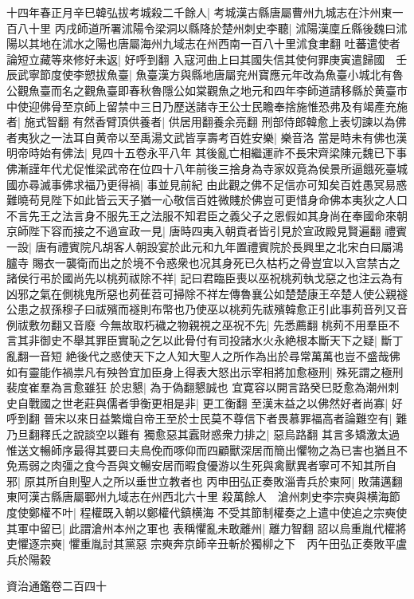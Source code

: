 十四年春正月辛巳韓弘拔考城殺二千餘人|{
	考城漢古縣唐屬曹州九城志在汴州東一百八十里}
丙戌師道所署沭陽令梁洞以縣降於楚州刺史李聽|{
	沭陽漢廩丘縣後魏曰沭陽以其地在沭水之陽也唐屬海州九域志在州西南一百八十里沭食聿翻}
吐蕃遣使者論短立藏等來修好未返|{
	好呼到翻}
入寇河曲上曰其國失信其使何罪庚寅遣歸國　壬辰武寧節度使李愬拔魚臺|{
	魚臺漢方與縣地唐屬兖州寶應元年改為魚臺小城北有魯公觀魚臺而名之觀魚臺即春秋魯隱公如棠觀魚之地元和四年李師道請移縣於黄臺市}
中使迎佛骨至京師上留禁中三日乃歷送諸寺王公士民瞻奉捨施惟恐弗及有竭產充施者|{
	施式智翻}
有然香臂頂供養者|{
	供居用翻養余亮翻}
刑部侍郎韓愈上表切諫以為佛者夷狄之一法耳自黄帝以至禹湯文武皆享壽考百姓安樂|{
	樂音洛}
當是時未有佛也漢明帝時始有佛法|{
	見四十五卷永平八年}
其後亂亡相繼運祚不長宋齊梁陳元魏已下事佛漸謹年代尤促惟梁武帝在位四十八年前後三捨身為寺家奴竟為侯景所逼餓死臺城國亦尋滅事佛求福乃更得禍|{
	事並見前紀}
由此觀之佛不足信亦可知矣百姓愚冥易惑難曉苟見陛下如此皆云天子猶一心敬信百姓微賤於佛豈可更惜身命佛本夷狄之人口不言先王之法言身不服先王之法服不知君臣之義父子之恩假如其身尚在奉國命來朝京師陛下容而接之不過宣政一見|{
	唐時四夷入朝貢者皆引見於宣政殿見賢遍翻}
禮賓一設|{
	唐有禮賓院凡胡客人朝設宴於此元和九年置禮賓院於長興里之北宋白曰屬鴻臚寺}
賜衣一襲衛而出之於境不令惑衆也况其身死已久枯朽之骨豈宜以入宫禁古之諸侯行弔於國尚先以桃茢祓除不祥|{
	記曰君臨臣喪以巫祝桃茢執戈惡之也注云為有凶邪之氣在側桃鬼所惡也茢萑苕可掃除不祥左傳魯襄公如楚楚康王卒楚人使公親襚公患之叔孫穆子曰祓殯而襚則布幣也乃使巫以桃茢先祓殯韓愈正引此事茢音列又音例祓敷勿翻又音廢}
今無故取朽穢之物親視之巫祝不先|{
	先悉薦翻}
桃茢不用羣臣不言其非御史不舉其罪臣實恥之乞以此骨付有司投諸水火永絶根本斷天下之疑|{
	斷丁亂翻一音短}
絶後代之惑使天下之人知大聖人之所作為出於尋常萬萬也豈不盛哉佛如有靈能作禍祟凡有殃咎宜加臣身上得表大怒出示宰相將加愈極刑|{
	殊死謂之極刑}
裴度崔羣為言愈雖狂於忠懇|{
	為于偽翻懇誠也}
宜寛容以開言路癸巳貶愈為潮州刺史自戰國之世老莊與儒者爭衡更相是非|{
	更工衡翻}
至漢末益之以佛然好者尚寡|{
	好呼到翻}
晉宋以來日益繁熾自帝王至於士民莫不尊信下者畏慕罪福高者論難空有|{
	難乃旦翻釋氏之說談空以難有}
獨愈惡其蠧財惑衆力排之|{
	惡烏路翻}
其言多矯激太過惟送文暢師序最得其要曰夫鳥俛而啄仰而四顧獸深居而簡出懼物之為已害也猶且不免焉弱之肉彊之食今吾與文暢安居而暇食優游以生死與禽獸異者寧可不知其所自邪|{
	原其所自則聖人之所以垂世立教者也}
丙申田弘正奏敗淄青兵於東阿|{
	敗蒲邁翻東阿漢古縣唐屬鄆州九域志在州西北六十里}
殺萬餘人　滄州刺史李宗奭與横海節度使鄭權不叶|{
	程權既入朝以鄭權代鎮横海}
不受其節制權奏之上遣中使追之宗奭使其軍中留已|{
	此謂滄州本州之軍也}
表稱懼亂未敢離州|{
	離力智翻}
詔以烏重胤代權將吏懼逐宗奭|{
	懼重胤討其黨惡}
宗奭奔京師辛丑斬於獨柳之下　丙午田弘正奏敗平盧兵於陽穀

資治通鑑卷二百四十
